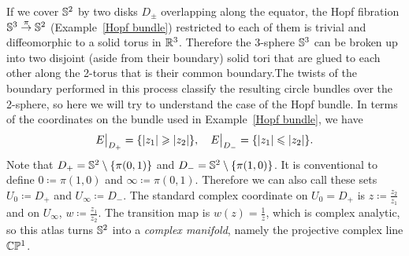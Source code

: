 \begin{example}\label{ex hopf bundle atlas}
    If we cover $\mathbb{S}^2$ by two disks $D_\pm$ overlapping along the equator, the Hopf fibration $\mathbb{S}^3\overset\pi\to \mathbb{S}^2$ (Example~\ref{Hopf bundle}) restricted to each of them is trivial and diffeomorphic to a solid torus in $\mathbb{R}^3$. Therefore the 3-sphere $\mathbb{S}^3$ can be broken up into two disjoint (aside from their boundary) solid tori that are glued to each other along the 2-torus that is their common boundary.The twists of the boundary performed in this process classify the resulting circle bundles over the 2-sphere, so here we will try to understand the case of the Hopf bundle. In terms of the coordinates on the bundle used in Example~\ref{Hopf bundle}, we have 
    \[\restr{E}{D_+}=\{|z_1|\geq|z_2|\},\quad \restr{E}{D_-}=\{|z_1|\leq|z_2|\}.\]
    Note that $D_+=\mathbb{S}^2\setminus \{\pi(0,1)\}$ and $D_-=\mathbb{S}^2 \setminus \{\pi(1,0)\}$. It is conventional to define $0\coloneqq \pi(1,0)$ and $\infty\coloneqq \pi(0,1)$. Therefore we can also call these sets $U_0\coloneqq D_+$ and $U_\infty\coloneqq D_-$. The standard complex coordinate on $U_0=D_+$ is $z\coloneqq \frac{z_2}{z_1}$ and on $U_\infty$, $w\coloneqq \frac{z_1}{z_2}$. The transition map is $w(z)=\frac{1}{z}$, which is complex analytic, so this atlas turns $\mathbb{S}^2$ into a \emph{complex manifold}, namely the projective complex line $\mathbb{C}\mathbb{P}^1$.
    

\end{example}
